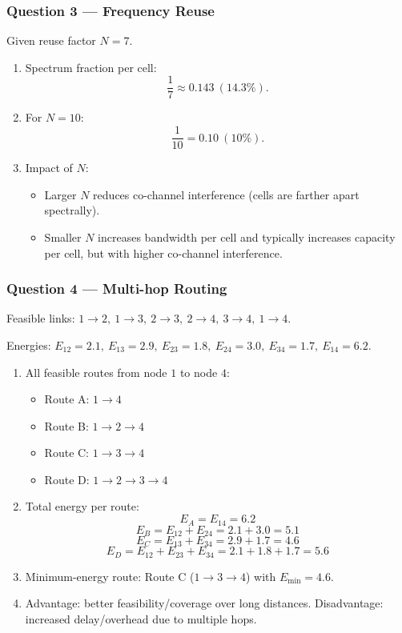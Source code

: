 \documentclass[11pt,a4paper]{article}
\begin{document}
\subsubsection*{Question 3 --- Frequency Reuse}
Given reuse factor $N=7$.

\begin{enumerate}[label=\alph*.]
    \item Spectrum fraction per cell:
    \[
    \frac{1}{7}\approx 0.143\ (14.3\%).
    \]
    \item For $N=10$:
    \[
    \frac{1}{10}=0.10\ (10\%).
    \]
    \item Impact of $N$:
    \begin{itemize}
        \item Larger $N$ reduces co-channel interference (cells are farther apart spectrally).
        \item Smaller $N$ increases bandwidth per cell and typically increases capacity per cell, but with higher co-channel interference.
    \end{itemize}
    
\end{enumerate}

\subsubsection*{Question 4 --- Multi-hop Routing}
Feasible links: $1\to 2,\ 1\to 3,\ 2\to 3,\ 2\to 4,\ 3\to 4,\ 1\to 4$.

Energies: $E_{12}=2.1,\ E_{13}=2.9,\ E_{23}=1.8,\ E_{24}=3.0,\ E_{34}=1.7,\ E_{14}=6.2$.

\begin{enumerate}[label=\alph*.]
    \item All feasible routes from node $1$ to node $4$:
    \begin{itemize}
        \item Route A: $1\to 4$
        \item Route B: $1\to 2\to 4$
        \item Route C: $1\to 3\to 4$
        \item Route D: $1\to 2\to 3\to 4$
    \end{itemize}
    \item Total energy per route:
    \[
    E_A=E_{14}=6.2
    \]
    \[
    E_B=E_{12}+E_{24}=2.1+3.0=5.1
    \]
    \[
    E_C=E_{13}+E_{34}=2.9+1.7=4.6
    \]
    \[
    E_D=E_{12}+E_{23}+E_{34}=2.1+1.8+1.7=5.6
    \]
    \item Minimum-energy route: Route C ($1\to 3\to 4$) with $E_{\min}=4.6$.
    \item Advantage: better feasibility/coverage over long distances. Disadvantage: increased delay/overhead due to multiple hops.
\end{enumerate}
\end{document}
